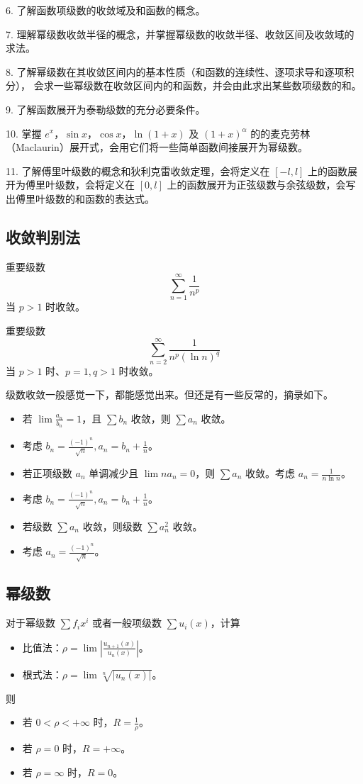6. 了解函数项级数的收敛域及和函数的概念。

7. 理解幂级数收敛半径的概念，并掌握幂级数的收敛半径、收敛区间及收敛域的求法。

8. 了解幂级数在其收敛区间内的基本性质（和函数的连续性、逐项求导和逐项积分），
会求一些幂级数在收敛区间内的和函数，并会由此求出某些数项级数的和。

9. 了解函数展开为泰勒级数的充分必要条件。

10. 掌握 $e^x$，$\sin x$，$\cos x$，$\ln(1+x)$ 及 $(1+x)^{\alpha}$ 的的麦克劳林（Maclaurin）展开式，会用它们将一些简单函数间接展开为幂级数。

11. 了解傅里叶级数的概念和狄利克雷收敛定理，会将定义在 $[-l, l]$ 上的函数展开为傅里叶级数，会将定义在 $[0, l]$ 上的函数展开为正弦级数与余弦级数，会写出傅里叶级数的和函数的表达式。

\subsection{收敛判别法}

重要级数
\[ \sum_{n=1}^\infty {\frac{1}{n^p}} \]
当 $p > 1$ 时收敛。

重要级数
\[ \sum_{n=2}^\infty {\frac{1}{n^p (\ln n)^q}} \]
当 $p > 1$ 时、$p=1, q > 1$ 时收敛。

级数收敛一般感觉一下，都能感觉出来。但还是有一些反常的，摘录如下。
\begin{itemize}
	\item 若 $\lim \frac{a_n}{b_n} = 1$，且 $\sum b_n$ 收敛，则 $\sum a_n$ 收敛。
	\item 考虑 $b_n = \frac{(-1)^n}{\sqrt{n}}, a_n = b_n + \frac{1}{n}$。
	\item 若正项级数 $a_n$ 单调减少且 $\lim n a_n = 0$，则 $\sum a_n$ 收敛。考虑 $a_n = \frac{1}{n \ln n}$。
	\item 考虑 $b_n = \frac{(-1)^n}{\sqrt{n}}, a_n = b_n + \frac{1}{n}$。
	\item 若级数 $\sum a_n$ 收敛，则级数 $\sum a_n^2$ 收敛。
	\item 考虑 $a_n = \frac{(-1)^n}{\sqrt{n}}$。
\end{itemize}

\subsection{幂级数}


对于幂级数 $\sum f_i x^i$ 或者一般项级数 $\sum u_i(x)$，计算
\begin{itemize}
	\item 比值法：$\rho = \lim \left| \frac{u_{n+1}(x)}{u_n(x)} \right|$。
	\item 根式法：$\rho = \lim \sqrt[n]{|u_n(x)|}$。
\end{itemize}
则
\begin{itemize}
	\item 若 $0 < \rho < +\infty$ 时，$R = \frac{1}{\rho}$。
	\item 若 $\rho = 0$ 时，$R = +\infty$。
	\item 若 $\rho = \infty$ 时，$R = 0$。
\end{itemize}

